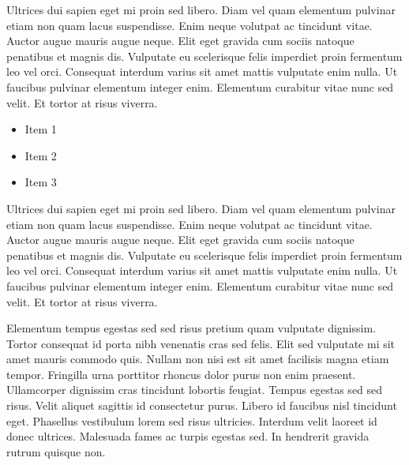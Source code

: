 \documentclass[10pt]{article}
\begin{document}
\begin{multicols}{2}
Ultrices dui sapien eget mi proin sed libero. Diam vel quam elementum pulvinar etiam non quam lacus suspendisse. Enim neque volutpat ac tincidunt vitae. Auctor augue mauris augue neque. Elit eget gravida cum sociis natoque penatibus et magnis dis. Vulputate eu scelerisque felis imperdiet proin fermentum leo vel orci. Consequat interdum varius sit amet mattis vulputate enim nulla. Ut faucibus pulvinar elementum integer enim. Elementum curabitur vitae nunc sed velit. Et tortor at risus viverra.

\begin{itemize}
\item Item 1
\item Item 2
\item Item 3
\end{itemize}

Ultrices dui sapien eget mi proin sed libero. Diam vel quam elementum pulvinar etiam non quam lacus suspendisse. Enim neque volutpat ac tincidunt vitae. Auctor augue mauris augue neque. Elit eget gravida cum sociis natoque penatibus et magnis dis. Vulputate eu scelerisque felis imperdiet proin fermentum leo vel orci. Consequat interdum varius sit amet mattis vulputate enim nulla. Ut faucibus pulvinar elementum integer enim. Elementum curabitur vitae nunc sed velit. Et tortor at risus viverra.

Elementum tempus egestas sed sed risus pretium quam vulputate dignissim. Tortor consequat id porta nibh venenatis cras sed felis. Elit sed vulputate mi sit amet mauris commodo quis. Nullam non nisi est sit amet facilisis magna etiam tempor. Fringilla urna porttitor rhoncus dolor purus non enim praesent. Ullamcorper dignissim cras tincidunt lobortis feugiat. Tempus egestas sed sed risus. Velit aliquet sagittis id consectetur purus. Libero id faucibus nisl tincidunt eget. Phasellus vestibulum lorem sed risus ultricies. Interdum velit laoreet id donec ultrices. Malesuada fames ac turpis egestas sed. In hendrerit gravida rutrum quisque non.

\end{multicols}
\end{document}
